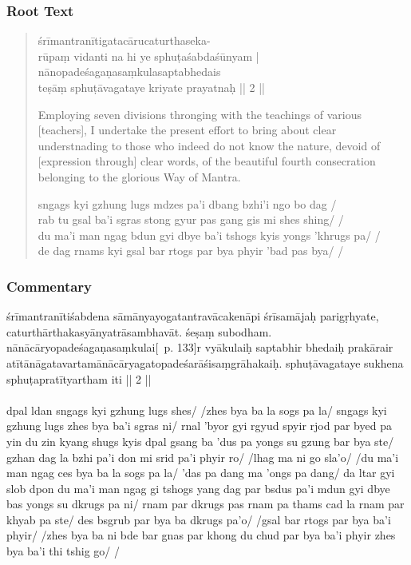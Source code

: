 \documentclass[12pt]{article}
\begin{document}
\subsubsection{Root Text}
\begin{quote}
	śrīmantranītigatacārucaturthaseka-\\
	rūpaṃ vidanti na hi ye sphuṭaśabdaśūnyam |\\
	nānopadeśagaṇasaṃkulasaptabhedais\\
	teṣāṃ sphuṭāvagataye kriyate prayatnaḥ || 2 ||

	Employing seven divisions thronging with the teachings of various [teachers], I undertake the present effort to bring about clear understnading to those who indeed do not know the nature, devoid of [expression through] clear words, of the beautiful fourth consecration belonging to the glorious Way of Mantra.

	sngags kyi gzhung lugs mdzes pa'i dbang bzhi'i ngo bo dag /\\
	rab tu gsal ba'i sgras stong gyur pas gang gis mi shes shing/ /\\
	du ma'i man ngag bdun gyi dbye ba'i tshogs kyis yongs 'khrugs pa/ /\\
	de dag rnams kyi gsal bar rtogs par bya phyir 'bad pas bya/ /
\end{quote}

\subsubsection{Commentary}
śrīmantranītiśabdena sāmānyayogatantravācakenāpi śrīsamājaḥ parigṛhyate, caturthārthakasyānyatrāsambhavāt.
śeṣaṃ subodham.
nānācāryopadeśagaṇasaṃkulai[\EDD\ p. 133]r vyākulaiḥ saptabhir bhedaiḥ prakārair atītānāgatavartamānācāryagatopadeśarāśisaṃgrāhakaiḥ.
sphuṭāvagataye sukhena sphuṭapratītyartham iti || 2 ||\\

\textbf{\TVA}\\
dpal ldan sngags kyi gzhung lugs shes/ /zhes bya ba la sogs pa la/ sngags kyi gzhung lugs zhes bya ba'i sgras ni/ rnal 'byor gyi rgyud spyir rjod par byed pa yin du zin kyang shugs kyis dpal gsang ba 'dus pa yongs su gzung bar bya ste/ gzhan dag la bzhi pa'i don mi srid pa'i phyir ro/ /lhag ma ni go sla'o/ /du ma'i man ngag ces bya ba la sogs pa la/ 'das pa dang ma 'ongs pa dang/ da ltar gyi slob dpon du ma'i man ngag gi tshogs yang dag par bsdus pa'i mdun gyi dbye bas yongs su dkrugs pa ni/ rnam par dkrugs pas rnam pa thams cad la rnam par khyab pa ste/ des bsgrub par bya ba dkrugs pa'o/ /gsal bar rtogs par bya ba'i phyir/ /zhes bya ba ni bde bar gnas par khong du chud par bya ba'i phyir zhes bya ba'i thi tshig go/ /\\
\end{document}

